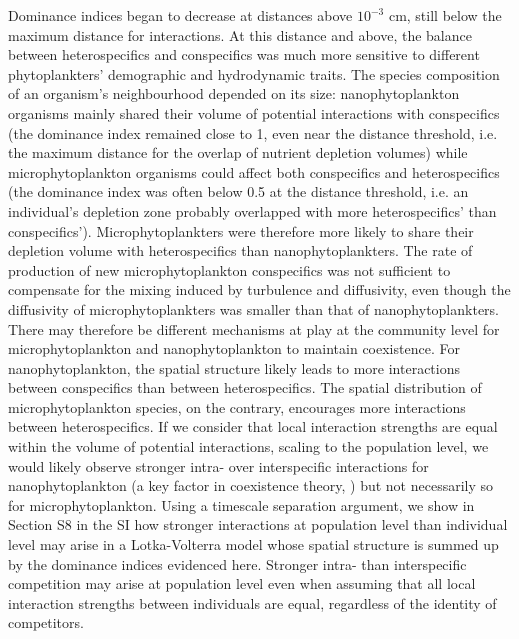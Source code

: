 \documentclass[12pt,english]{article}
\begin{document}
Dominance indices began to decrease at distances above $10^{-3}$
cm, still below the maximum distance for interactions. At this distance
and above, the balance between heterospecifics and conspecifics was
much more sensitive to different phytoplankters' demographic and hydrodynamic
traits. The species composition of an organism's neighbourhood depended
on its size: nanophytoplankton organisms mainly shared their volume
of potential interactions with conspecifics (the dominance index remained
close to 1, even near the distance threshold, i.e. the maximum distance
for the overlap of nutrient depletion volumes) while microphytoplankton
organisms could affect both conspecifics and heterospecifics (the
dominance index was often below 0.5 at the distance threshold, i.e.
an individual's depletion zone probably overlapped with more heterospecifics'
than conspecifics'). Microphytoplankters were therefore more likely
to share their depletion volume with heterospecifics than nanophytoplankters.
The rate of production of new microphytoplankton conspecifics was
not sufficient to compensate for the mixing induced by turbulence
and diffusivity, even though the diffusivity of microphytoplankters
was smaller than that of nanophytoplankters. There may therefore be
different mechanisms at play at the community level for microphytoplankton
and nanophytoplankton to maintain coexistence. For nanophytoplankton,
the spatial structure likely leads to more interactions between conspecifics
than between heterospecifics. The spatial distribution of microphytoplankton
species, on the contrary, encourages more interactions between heterospecifics.
If we consider that local interaction strengths are equal within the
volume of potential interactions, scaling to the population level,
we would likely observe stronger intra- over interspecific interactions
for nanophytoplankton (a key factor in coexistence theory, \citealp{barabas_self-regulation_2017})
but not necessarily so for microphytoplankton. Using a timescale separation
argument, we show in Section S8 in the SI how stronger interactions
at population level than individual level may arise in a Lotka-Volterra
model whose spatial structure is summed up by the dominance indices
evidenced here. Stronger intra- than interspecific competition may
arise at population level even when assuming that all local interaction
strengths between individuals are equal, regardless of the identity
of competitors.
\end{document}
